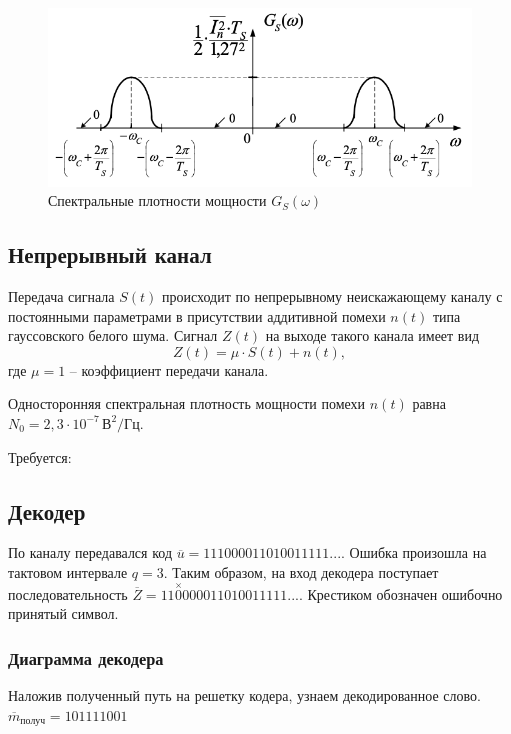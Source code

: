 \documentclass[a4paper, 12pt]{article}
\begin{document}
\begin{enumerate}
  \begin{figure}[H]
    \centering
    \includegraphics{GSOmega}
    \caption{Спектральные плотности мощности $G_S(\omega)$}
  \end{figure}
\end{enumerate}

\subsection{Непрерывный канал}
Передача сигнала $S(t)$ происходит по непрерывному неискажающему 
каналу с постоянными параметрами в присутствии аддитивной помехи
$n(t)$ типа гауссовского белого шума. Сигнал $Z(t)$ на выходе такого 
канала имеет вид
\begin{equation}
  Z(t)=\mu\cdot S(t)+n(t),
\end{equation}
где $\mu=1$ -- коэффициент передачи канала. 

Односторонняя спектральная плотность мощности помехи $n(t)$ 
равна $N_0=2,3\cdot 10^{-7}\,В^2/Гц$.

Требуется:
\begin{enumerate}
  
\end{enumerate}

\subsection{Декодер}
По каналу передавался код 
\(\overline{u}=11 10 00 01 10 10 01 11 11...\).
Ошибка произошла на тактовом интервале \(q=3\).
Таким образом, на вход декодера поступает последовательность 
\(\overline{Z}=11 \overset{\times}{0} 0 00 01 10 10 01 11 11...\). Крестиком обозначен ошибочно принятый символ.

\subsubsection{Диаграмма декодера}


Наложив полученный путь на решетку кодера, узнаем декодированное слово.
$\overline{m}_{получ}=101111001$
\end{document}
